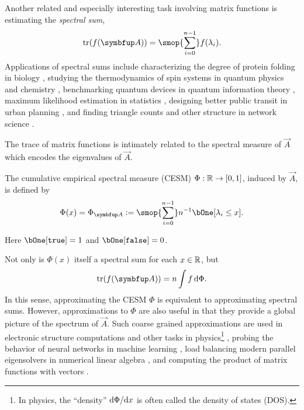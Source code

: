 Another related and especially interesting task involving matrix functions is estimating the \emph{spectral sum},
\begin{equation}
    \label{eqn:spectral_sum}
    \tr(\fA) = \smop{\sum_{i=0}^{n-1}} f(\lambda_i).
\end{equation}
Applications of spectral sums include
characterizing the degree of protein folding in biology \cite{estrada_00},
studying the thermodynamics of spin systems in quantum physics and chemistry \cite{weisse_wellein_alvermann_fehske_06,schnalle_schnack_10,schnack_richter_steinigeweg_20,jin_willsch_willsch_lagemann_michielsen_deraedt_21},
benchmarking quantum devices in quantum information theory \cite{jozsa_94},
maximum likelihood estimation in statistics \cite{barry_pace_99,pace_lesage_04},
designing better public transit in urban planning \cite{bergermann_stoll_22,wang_sun_musco_bao_21}, and 
finding triangle counts and other structure in network science \cite{avron_10,dong_benson_bindel_19,benzi_boito_20}.

The trace of matrix functions is intimately related to the spectral measure of \( \vec{A} \) which encodes the eigenvalues of \( \vec{A} \).
\begin{definition}
\label{def:CESM}
The cumulative empirical spectral measure (CESM) \( \Phi : \mathbb{R} \to [0,1] \), induced by \( \vec{A} \), is defined by
\begin{equation*}
    \Phi(x)
    = \Phi_{\vec{A}}
    := \smop{\sum_{i=0}^{n-1}} n^{-1} \bOne[ \lambda_i \leq x].
\end{equation*}
\end{definition}
Here \( \bOne[ \texttt{true} ] =1 \) and \( \bOne[\texttt{false}] = 0 \).

Not only is \( \Phi(x) \) itself a spectral sum for each \( x\in\mathbb{R} \), but 
\begin{equation*}
    \tr(\fA) = n \int f\,\d\Phi.
\end{equation*}
In this sense, approximating the CESM \( \Phi \) is equivalent to approximating spectral sums.
However, approximations to \( \Phi \) are also useful in that they provide a global picture of the spectrum of \( \vec{A} \).
Such coarse grained approximations are used in 
electronic structure computations %
and other tasks in physics\footnote{In physics, the ``density'' \( \textup{d}\Phi/\textup{d} x \) is often called the density of states (DOS).} \cite{weisse_wellein_alvermann_fehske_06,jin_willsch_willsch_lagemann_michielsen_deraedt_21},
probing the behavior of neural networks in machine learning \cite{ghorbani_krishnan_xiao_19,papyan_19,granziol_wan_garipov_19,yao_gholami_keutzer_mahoney_20}, load balancing modern parallel eigensolvers in numerical linear algebra \cite{polizzi_09,evsl_19}, and computing the product of matrix functions with vectors \cite{fan_shuman_ubaru_saad_19}.

